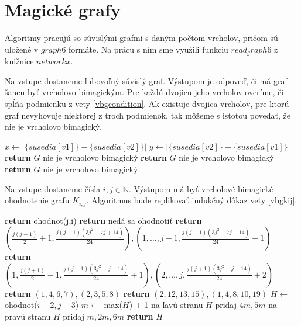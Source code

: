 \section{Magické grafy}

Algoritmy pracujú so súvislými grafmi s daným počtom vrcholov, pričom sú uložené v $graph6$ formáte. Na prácu s ním sme využili funkciu $read_graph6$ z knižnice $networkx$. \\
 
\begin{alg}
\label{algvbgcondition}
Na vstupe dostaneme ľubovoľný súvislý graf. Výstupom je odpoveď, či má graf šancu byť vrcholovo bimagickým. Pre každú dvojicu jeho vrcholov overíme, či spĺňa podmienku z vety \ref{vbgcondition}. Ak existuje dvojica vrcholov, pre ktorú graf nevyhovuje niektorej z troch podmienok, tak môžeme s istotou povedať, že nie je vrcholovo bimagický.
\end{alg}

\begin{algorithmic}
    \STATE $x \gets |\{susedia[v1]\} - \{susedia[v2]\}|$
    \STATE $y \gets |\{susedia[v2]\} - \{susedia[v1]\}|$
	\STATE \textbf{return} $G$ nie je vrcholovo bimagický
    \ENDIF
	\STATE \textbf{return} $G$ nie je vrcholovo bimagický
    \ENDIF
	\STATE \textbf{return} $G$ nie je vrcholovo bimagický
    \ENDIF
\ENDFOR
\end{algorithmic}


\begin{alg}
\label{algvbgkij}
Na vstupe dostaneme čísla $i,j \in \mathbb{N}$. Výstupom má byť vrcholové bimagické ohodnotenie grafu $K_{i,j}$. Algoritmus bude replikovať indukčný dôkaz vety \ref{vbgkij}.
\end{alg}

\begin{algorithmic}
	\STATE \textbf{return} ohodnot(j,i)
\ENDIF
{}
	\STATE \textbf{return} nedá sa ohodnotiť
\ENDIF
{}
	\STATE \textbf{return} $(\frac{j(j-1)}{2} + 1, \frac{j(j-1)(3j^2-7j+14)}{24}), (1, \dots , j-1, \frac{j(j-1)(3j^2-7j+14)}{24} + 1)$
\ENDIF
{}
	\STATE \textbf{return} $(1, \frac{j(j+1)}{2} - 1, \frac{j(j+1)(3j^2-j-14)}{24} + 1), (2, \dots , j, \frac{j(j+1)(3j^2-j-14)}{24} + 2)$
\ENDIF
{}
	\STATE \textbf{return} $(1, 4, 6, 7), (2, 3, 5, 8)$
\ENDIF
{}
	\STATE \textbf{return} $(2, 12, 13, 15), (1, 4, 8, 10, 19)$
\ENDIF
\STATE $H \gets$ ohodnot($i - 2, j - 3$)
\STATE $m \gets$ max($H$) + 1
\STATE na ľavú stranu $H$ pridaj $4m, 5m$
\STATE na pravú stranu $H$ pridaj $m, 2m, 6m$
\STATE \textbf{return} $H$
\end{algorithmic}

